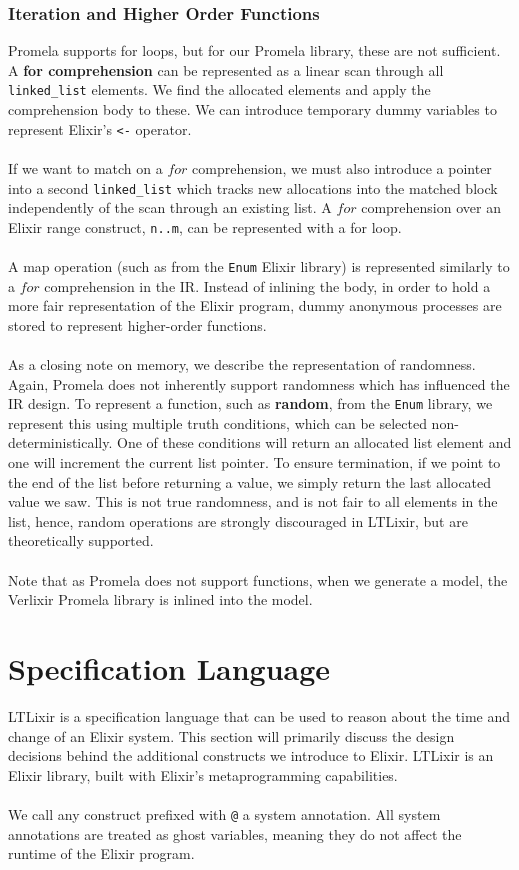 \subsubsection{Iteration and Higher Order Functions}
Promela supports for loops, but for our Promela library, these are not sufficient. A \textbf{for comprehension} can be represented as a linear scan through all \texttt{linked\_list} elements. We find the allocated elements and apply the comprehension body to these. We can introduce temporary dummy variables to represent Elixir's \texttt{<-} operator. 
\\ \\
If we want to match on a $for$ comprehension, we must also introduce a pointer into a second \texttt{linked\_list} which tracks new allocations into the matched block independently of the scan through an existing list. A $for$ comprehension over an Elixir range construct, \texttt{n..m}, can be represented with a for loop.
\\ \\
A map operation (such as from the \texttt{Enum} Elixir library) is represented similarly to a $for$ comprehension in the IR. Instead of inlining the body, in order to hold a more fair representation of the Elixir program, dummy anonymous processes are stored to represent higher-order functions.
\\ \\
As a closing note on memory, we describe the representation of randomness. Again, Promela does not inherently support randomness which has influenced the IR design. To represent a function, such as \textbf{random}, from the \texttt{Enum} library, we represent this using multiple truth conditions, which can be selected non-deterministically. One of these conditions will return an allocated list element and one will increment the current list pointer. To ensure termination, if we point to the end of the list before returning a value, we simply return the last allocated value we saw. This is not true randomness, and is not fair to all elements in the list, hence, random operations are strongly discouraged in LTLixir, but are theoretically supported.
\\ \\
Note that as Promela does not support functions, when we generate a model, the Verlixir Promela library is inlined into the model.

\section{Specification Language} \label{sec:specification_language}
LTLixir is a specification language that can be used to reason about the time and change of an Elixir system. This section will primarily discuss the design decisions behind the additional constructs we introduce to Elixir. LTLixir is an Elixir library, built with Elixir's metaprogramming capabilities.
\\ \\
We call any construct prefixed with \texttt{@} a system annotation. All system annotations are treated as ghost variables, meaning they do not affect the runtime of the Elixir program.
\\ \\
